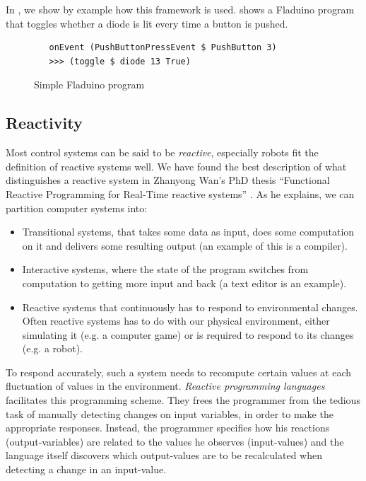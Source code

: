 \documentclass[a4paper, oneside, final]{memoir}
\let\fref\undefined
\let\Fref\undefined
\begin{document}
In \fref[plain]{sec:pushbuttondef}, we show by example how this framework is
used. \Fref{fig:fladuino-simple} shows a Fladuino program that toggles
whether a diode is lit every time a button is pushed.

\begin{figure}
  \centering

\begin{verbatim}
   onEvent (PushButtonPressEvent $ PushButton 3)  
   >>> (toggle $ diode 13 True)
\end{verbatim}  

  \caption{Simple Fladuino program}
  \label{fig:fladuino-simple}
\end{figure}

\subsection{Reactivity}

Most control systems can be said to be \textit{reactive}, especially
robots fit the definition of reactive systems well.  We have found the
best description of what distinguishes a reactive system in Zhanyong
Wan's PhD thesis ``Functional Reactive Programming for Real-Time
reactive systems'' \cite{Chambers1992}.  As he explains, we can
partition computer systems into:
\begin{itemize}
\item Transitional systems, that takes some data as input, does some
  computation on it and delivers some resulting output (an example of this
  is a compiler).
\item Interactive systems, where the state of the program switches
  from computation to getting more input and back (a text editor is an
  example).
\item Reactive systems that continuously has to respond to
  environmental changes. Often reactive systems has to do with our
  physical environment, either simulating it (e.g. a computer game) or
  is required to respond to its changes (e.g. a robot).
\end{itemize}

To respond accurately, such a system needs to recompute certain values
at each fluctuation of values in the environment. \textit{Reactive
  programming languages} facilitates this programming scheme. They
frees the programmer from the tedious task of manually detecting
changes on input variables, in order to make the appropriate
responses. Instead, the programmer specifies how his reactions
(output-variables) are related to the values he observes
(input-values) and the language itself discovers which output-values
are to be recalculated when detecting a change in an input-value.
\end{document}
